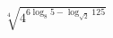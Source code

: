 \begin{ex}[type=calculate]
	\begin{condition}
		\( \sqrt[4]{4^{6\log_8 5 - \log_{\sqrt{2}}125}} \)
	\end{condition}
\end{ex}